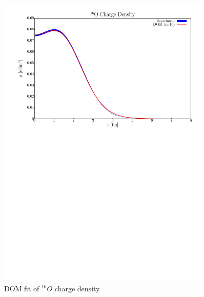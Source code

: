 \begin{figure}
\begin{center}
\includegraphics[width = 0.9\textwidth]{figures/o16_chargeDensity.png}
\caption{DOM fit of $^{16}O$ charge density}
\label{o16ChargeDensity}
\end{center}
\end{figure}

